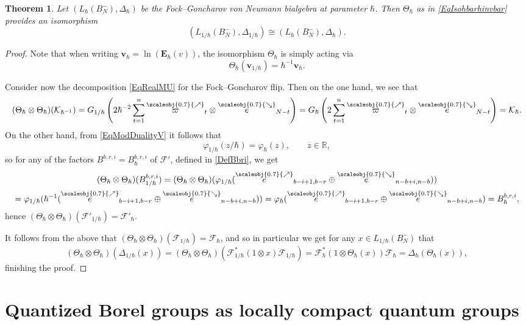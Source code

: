 \documentclass[11pt, reqno]{amsart}
\newtheorem{theorem}{Theorem}[section]
\theoremstyle{definition}
\numberwithin{equation}{section}
\def\Fc{\mathcal F'}
\def\R{\mathbb R}
\newcommand{\vb}{\mathbf{v}}
\newcommand{\eb}{\mathbf{E}}
\newcommand{\Gauss}{G}
\newcommand{\Kc}{\mathcal{K}}
\newcommand{\Fct}{\mathcal{F}}
\newcommand{\Bor}{B}
\newcommand{\nears}{\scaleobj{0.7}{\nearrow}}
\newcommand{\sears}{\scaleobj{0.7}{\searrow}}
\newcommand{\nee}{\overset{\nears}{e}}
\newcommand{\seee}{\overset{\sears}{e}}
\newcommand{\nevarpi}{\overset{\nears}{\varpi}}
\begin{document}
\begin{theorem}
Let $(L_{\hbar}(\Bor_N^-),\Delta_{\hbar})$ be the Fock--Goncharov von Neumann bialgebra at parameter $\hbar$. Then $\Theta_{\hbar}$ as in \eqref{EqIsohbarhinvbar} provides an isomorphism
\[
(L_{1/\hbar}(\Bor_N^-),\Delta_{1/\hbar}) \cong (L_{\hbar}(\Bor_N^-),\Delta_{\hbar}).
\]
\end{theorem}
\begin{proof}
Note that when writing $\vb_{\hbar} = \ln(\eb_{\hbar}(v))$, the isomorphism $\Theta_{\hbar}$ is simply acting via 
\[
\Theta_{\hbar}(\vb_{1/\hbar}) = \hbar^{-1}\vb_{\hbar}. 
\]


Consider now the decomposition \eqref{EqRealMU} for the Fock--Goncharov flip. Then on the one hand, we see that 
\[
(\Theta_{\hbar}\otimes \Theta_{\hbar})(\Kc_{\hbar^{-1}}) = \Gauss_{1/\hbar}\left(2\hbar^{-2}\sum_{t=1}^n \nevarpi_t \otimes \seee_{N-t}\right) =  \Gauss_{\hbar}\left(2\sum_{t=1}^n \nevarpi_t \otimes \seee_{N-t}\right) = \Kc_{\hbar}. 
\]
On the other hand, from \eqref{EqModDualityV} it follows that
\[
\varphi_{1/\hbar}(z/\hbar) = \varphi_{\hbar}(z),\qquad z\in \R,
\]
so for any of the factors $B^{b,r,i} = B_{\hbar}^{b,r,i}$ of $\Fc$, defined in \eqref{DefBbri}, we get 
\begin{multline*}
(\Theta_{\hbar}\otimes \Theta_{\hbar})(B_{1/{\hbar}}^{b,r,i}) = 
(\Theta_{\hbar}\otimes \Theta_{\hbar})(\varphi_{1/\hbar}(\nee_{b-i+1,b-r}\oplus \seee_{n-b+i,n-b})) \\ = \varphi_{1/\hbar}(\hbar^{-1}(\nee_{b-i+1,b-r}\oplus \seee_{n-b+i,n-b}))  =  \varphi_{\hbar}(\nee_{b-i+1,b-r}\oplus \seee_{n-b+i,n-b}) = B_{\hbar}^{b,r,i},
\end{multline*}
hence $(\Theta_{\hbar}\otimes \Theta_{\hbar})(\Fc_{1/\hbar}) = \Fc_{\hbar}$. 

It follows from the above that $(\Theta_{\hbar}\otimes \Theta_{\hbar})(\Fct_{1/\hbar}) = \Fct_{\hbar}$, and so in particular we get for any $x\in L_{1/\hbar}(\Bor_N^-)$ that 
\[
(\Theta_{\hbar}\otimes \Theta_{\hbar})(\Delta_{1/\hbar}(x)) = (\Theta_{\hbar}\otimes \Theta_{\hbar})(\Fct_{1/\hbar}^*(1\otimes x)\Fct_{1/\hbar}) = \Fct_{\hbar}^*(1\otimes \Theta_{\hbar}(x))\Fct_{\hbar} = \Delta_{\hbar}(\Theta_{\hbar}(x)),
\]
finishing the proof.
\end{proof}





\section{Quantized Borel groups as locally compact quantum groups}
\end{document}
